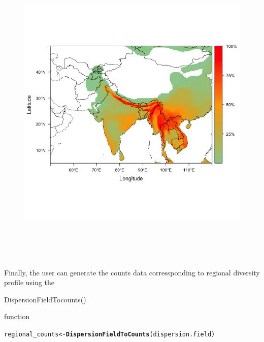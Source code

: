 \documentclass[12pt]{article}\usepackage[]{graphicx}\usepackage[usenames,dvipsnames]{color}
\makeatletter
\newcommand{\hlstd}[1]{\textcolor[rgb]{0.345,0.345,0.345}{#1}}%
\newcommand{\hlkwb}[1]{\textcolor[rgb]{0.69,0.353,0.396}{#1}}%
\newcommand{\hlkwd}[1]{\textcolor[rgb]{0.737,0.353,0.396}{\textbf{#1}}}%
\newenvironment{kframe}{%
 \def\at@end@of@kframe{}%
 \ifinner\ifhmode%
  \def\at@end@of@kframe{\end{minipage}}%
  \begin{minipage}{\columnwidth}%
 \fi\fi%
 \def\FrameCommand##1{\hskip\@totalleftmargin \hskip-\fboxsep
 \colorbox{shadecolor}{##1}\hskip-\fboxsep
     \hskip-\linewidth \hskip-\@totalleftmargin \hskip\columnwidth}%
 \MakeFramed {\advance\hsize-\width
   \@totalleftmargin\z@ \linewidth\hsize
   \@setminipage}}%
 {\par\unskip\endMakeFramed%
 \at@end@of@kframe}
\newenvironment{knitrout}{}{} %
\makeatother
\begin{document}
\begin{figure}[htp]
\begin{center}
\includegraphics[width=6in,height=6in]{figure/maps.png}
\end{center}
\end{figure}

Finally, the user can generate the counts data corressponding to regional diversity profile using the \\
\begin{verb} DispersionFieldTocounts() \end{verb} function

\begin{knitrout}
\color{fgcolor}\begin{kframe}
\begin{alltt}
\hlstd{regional_counts} \hlkwb{<-} \hlkwd{DispersionFieldToCounts}\hlstd{(dispersion.field)}
\end{alltt}
\end{kframe}
\end{knitrout}
\end{document}
